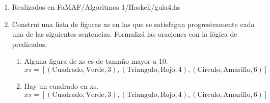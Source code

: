 \documentclass[12pt]{article} %
\begin{document}
\begin{enumerate}
    \item Realizados en FaMAF/Algoritmos 1/Haskell/guia4.hs
    \item Construi una lista de figuras xs en las que se satisfagan progresivamente cada una de las siguientes
    sentencias. Formalizá las oraciones con la lógica de predicados.
    \begin{enumerate}
        \item Alguna figura de xs es de tamaño mayor a 10. \\
        \( xs = [(\text{Cuadrado}, \text{Verde}, 3),(\text{Triangulo}, \text{Rojo}, 4), (\text{Circulo}, \text{Amarillo}, 6)] \) 
        \item Hay un cuadrado en xs. \\
        \( xs = [(\text{Cuadrado}, \text{Verde}, 3),(\text{Triangulo}, \text{Rojo}, 4), (\text{Circulo}, \text{Amarillo}, 6)] \)
    \end{enumerate}
\end{enumerate}
\end{document}
